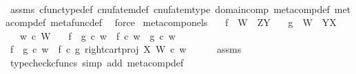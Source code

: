\begin{isabellebody}
\ \ \ \ \isamarkupfalse%
\ assms\ cfunc{\isacharunderscore}{\kern0pt}type{\isacharunderscore}{\kern0pt}def\ cnufatem{\isacharunderscore}{\kern0pt}def{}\ cnufatem{\isacharunderscore}{\kern0pt}type\ domain{\isacharunderscore}{\kern0pt}comp\ meta{\isacharunderscore}{\kern0pt}comp{}{\isacharunderscore}{\kern0pt}def{}\ meta{\isacharunderscore}{\kern0pt}comp{}{\isacharunderscore}{\kern0pt}def{}\ metafunc{\isacharunderscore}{\kern0pt}def\ \isamarkupfalse%
\ force\isanewline
{}\isamarkupfalse%
%
\endisatagproof
{\isafoldproof}%
%
\isadelimproof
\isanewline
%
\endisadelimproof
\isanewline
{}\isamarkupfalse%
\ meta{\isacharunderscore}{\kern0pt}comp{\isacharunderscore}{\kern0pt}on{\isacharunderscore}{\kern0pt}els{\isacharcolon}{\kern0pt}\isanewline
\ \ \ {\isachardoublequoteopen}f\ {\isacharcolon}{\kern0pt}\ W\ {\isasymrightarrow}\ Z\isactrlbsup Y\isactrlesup {\isachardoublequoteclose}\isanewline
\ \ \ {\isachardoublequoteopen}g\ {\isacharcolon}{\kern0pt}\ W\ {\isasymrightarrow}\ Y\isactrlbsup X\isactrlesup {\isachardoublequoteclose}\isanewline
\ \ \ {\isachardoublequoteopen}w\ {\isasymin}\isactrlsub c\ W{\isachardoublequoteclose}\isanewline
\ \ \ {\isachardoublequoteopen}{\isacharparenleft}{\kern0pt}f\ {\isasymbox}\ g{\isacharparenright}{\kern0pt}\ {\isasymcirc}\isactrlsub c\ w\ {\isacharequal}{\kern0pt}\ {\isacharparenleft}{\kern0pt}f\ {\isasymcirc}\isactrlsub c\ w{\isacharparenright}{\kern0pt}\ {\isasymbox}\ {\isacharparenleft}{\kern0pt}g\ {\isasymcirc}\isactrlsub c\ w{\isacharparenright}{\kern0pt}{\isachardoublequoteclose}\isanewline
%
\isadelimproof
%
\endisadelimproof
%
\isatagproof
{}\isamarkupfalse%
\ {\isacharminus}{\kern0pt}\ \isanewline
\ \ \isamarkupfalse%
\ {\isachardoublequoteopen}{\isacharparenleft}{\kern0pt}f\ {\isasymbox}\ g{\isacharparenright}{\kern0pt}\ {\isasymcirc}\isactrlsub c\ w\ {\isacharequal}{\kern0pt}\ {\isacharparenleft}{\kern0pt}f\isactrlsup {\isasymflat}\ {\isasymcirc}\isactrlsub c\ {\isasymlangle}g\isactrlsup {\isasymflat}{\isacharcomma}{\kern0pt}\ right{\isacharunderscore}{\kern0pt}cart{\isacharunderscore}{\kern0pt}proj\ X\ W{\isasymrangle}{\isacharparenright}{\kern0pt}\isactrlsup {\isasymsharp}\ {\isasymcirc}\isactrlsub c\ w{\isachardoublequoteclose}\isanewline
\ \ \ \ \isamarkupfalse%
\ assms\ \isamarkupfalse%
\ {\isacharparenleft}{\kern0pt}typecheck{\isacharunderscore}{\kern0pt}cfuncs{\isacharcomma}{\kern0pt}\ simp\ add{\isacharcolon}{\kern0pt}\ meta{\isacharunderscore}{\kern0pt}comp{}{\isacharunderscore}{\kern0pt}def{}{\isacharparenright}{\kern0pt}\isanewline

\end{isabellebody}
